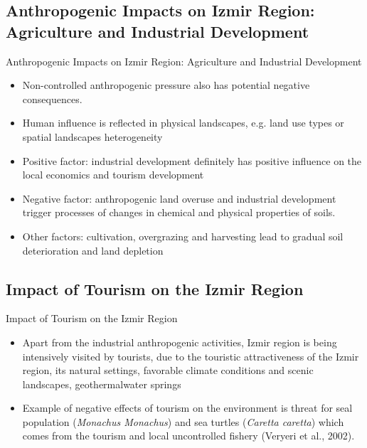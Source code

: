 \documentclass[pdflatex,compress,9pt,
	xcolor={dvipsnames,dvipsnames,svgnames,x11names,table},
	hyperref={colorlinks = true,breaklinks = true, urlcolor = NavyBlue, breaklinks = true}]{beamer}
\begin{document}
\subsection{Anthropogenic Impacts on Izmir Region: Agriculture and Industrial Development}
\begin{frame}{Anthropogenic Impacts on Izmir Region: Agriculture and Industrial Development}
\begin{itemize}
            \item Non-controlled anthropogenic pressure also has potential negative consequences.
            \item Human influence is reflected in physical landscapes, e.g. land use types or spatial landscapes heterogeneity
            \item Positive factor: industrial development definitely has positive influence on the local economics and tourism development 
            \item Negative factor: anthropogenic land overuse and industrial development  trigger processes of changes in chemical and physical properties of soils.
            \item Other factors: cultivation, overgrazing and harvesting lead to gradual soil deterioration and land depletion
\end{itemize}
\end{frame}

\subsection{Impact of Tourism on the Izmir Region}
\begin{frame}{Impact of Tourism on the Izmir Region}
\begin{itemize}
            \item Apart from the industrial anthropogenic activities, Izmir region is being intensively visited by tourists, due to the touristic attractiveness of the Izmir region, its natural settings, favorable climate conditions and scenic landscapes, geothermalwater springs
            \item Example of negative effects of tourism on the environment is threat for seal population (\emph{Monachus Monachus}) and sea turtles (\emph{Caretta caretta}) which comes from the tourism and local uncontrolled fishery (Veryeri et al., 2002).
\end{itemize}
\end{frame}
\end{document}

